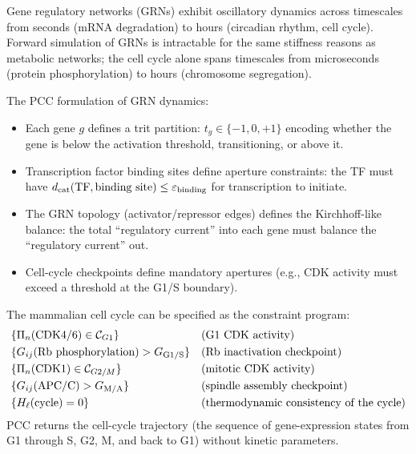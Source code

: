 Gene regulatory networks (GRNs) exhibit oscillatory dynamics across timescales
from seconds (mRNA degradation) to hours (circadian rhythm, cell cycle).
Forward simulation of GRNs is intractable for the same stiffness reasons as
metabolic networks; the cell cycle alone spans timescales from microseconds
(protein phosphorylation) to hours (chromosome segregation).

The PCC formulation of GRN dynamics:

\begin{itemize}[noitemsep]
    \item Each gene $g$ defines a trit partition: $t_g \in \{-1, 0, +1\}$
          encoding whether the gene is below the activation threshold,
          transitioning, or above it.
    \item Transcription factor binding sites define aperture constraints:
          the TF must have $d_{\mathrm{cat}}(\text{TF}, \text{binding site}) \le
          \varepsilon_\mathrm{binding}$ for transcription to initiate.
    \item The GRN topology (activator/repressor edges) defines the
          Kirchhoff-like balance: the total ``regulatory current'' into each
          gene must balance the ``regulatory current'' out.
    \item Cell-cycle checkpoints define mandatory apertures (e.g., CDK
          activity must exceed a threshold at the G1/S boundary).
\end{itemize}

\begin{example}
\label{ex:cell-cycle}
The mammalian cell cycle can be specified as the constraint program:
\begin{align*}
    &\{\Pi_n(\text{CDK4/6}) \in \mathcal{C}_{G1}\}
    &&\text{(G1 CDK activity)} \\
    &\{G_{ij}(\text{Rb phosphorylation}) > G_\mathrm{G1/S}\}
    &&\text{(Rb inactivation checkpoint)} \\
    &\{\Pi_n(\text{CDK1}) \in \mathcal{C}_{G2/M}\}
    &&\text{(mitotic CDK activity)} \\
    &\{G_{ij}(\text{APC/C}) > G_\mathrm{M/A}\}
    &&\text{(spindle assembly checkpoint)} \\
    &\{H_\ell(\text{cycle}) = 0\}
    &&\text{(thermodynamic consistency of the cycle)}
\end{align*}
PCC returns the cell-cycle trajectory (the sequence of gene-expression states
from G1 through S, G2, M, and back to G1) without kinetic parameters.
\end{example}

